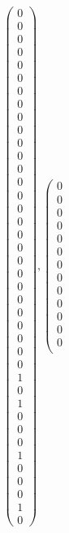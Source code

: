 \documentclass[8pt]{article}
\begin{document}
 \newline \begin{align*}
 \left(\begin{array}{r}
0 \\
0 \\
0 \\
0 \\
0 \\
0 \\
0 \\
0 \\
0 \\
0 \\
0 \\
0 \\
0 \\
0 \\
0 \\
0 \\
0 \\
0 \\
0 \\
0 \\
0 \\
0 \\
0 \\
0 \\
0 \\
0 \\
0 \\
0 \\
1 \\
0 \\
1 \\
0 \\
0 \\
0 \\
1 \\
0 \\
0 \\
0 \\
1 \\
0
\end{array}\right) ,
 \left(\begin{array}{r}
0 \\
0 \\
0 \\
0 \\
0 \\
0 \\
0 \\
0 \\
0 \\
0 \\
0 \\
0 \\
0 \\

\end{array}
\end{align*}
\end{document}
